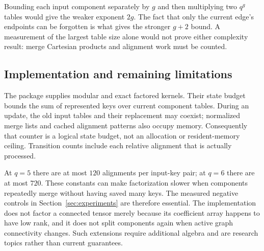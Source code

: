 Bounding each input component separately by $g$ and then multiplying two
$q^g$ tables would give the weaker exponent $2g$.
The fact that only the current edge's endpoints can be forgotten is what
gives the stronger $g+2$ bound. A measurement of the largest table size alone
would not prove either complexity result: merge Cartesian products and
alignment work must be counted.

\subsection{Implementation and remaining limitations}

The package supplies modular and exact factored kernels. Their state budget
bounds the sum of represented keys over current component tables. During an
update, the old input tables and their replacement may coexist; normalized
merge lists and cached alignment patterns also occupy memory.
Consequently that counter is a logical state budget, not an allocation or
resident-memory ceiling. Transition counts include each relative alignment
that is actually processed.

At $q=5$ there are at most $120$ alignments per input-key pair; at $q=6$
there are at most $720$. These constants can make factorization slower when
components repeatedly merge without having saved many keys. The measured
negative controls in Section~\ref{sec:experiments} are therefore essential.
The implementation does not factor a connected tensor merely because its
coefficient array happens to have low rank, and it does not split components
again when active graph connectivity changes. Such extensions require
additional algebra and are research topics rather than current guarantees.
